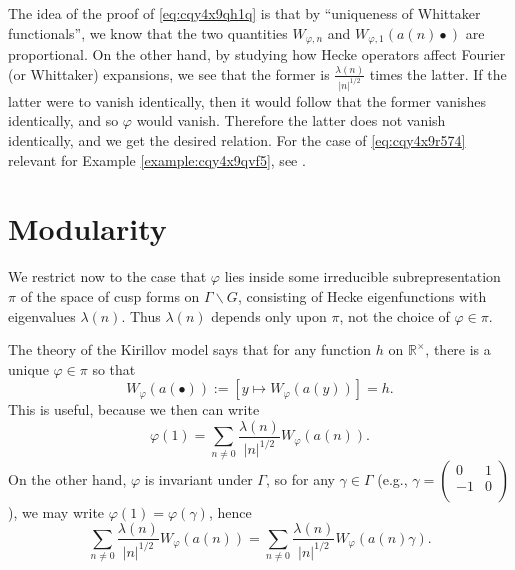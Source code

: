 \documentclass[reqno]{amsart} 
\begin{document}
\begin{remark}\label{remark:cqy4x9qmpf}
  The idea of the proof of \eqref{eq:cqy4x9qh1q} is that by ``uniqueness of Whittaker functionals'', we know that the two quantities $W_{\varphi, n}$ and $W_{\varphi, 1}(a(n) \bullet)$ are proportional.  On the other hand, by studying how Hecke operators affect Fourier (or Whittaker) expansions, we see that the former is $\frac{\lambda(n)}{\lvert n \rvert^{1/2}}$ times the latter.  If the latter were to vanish identically, then it would follow that the former vanishes identically, and so $\varphi$ would vanish.  Therefore the latter does not vanish identically, and we get the desired relation.  For the case of \eqref{eq:cqy4x9r574} relevant for Example \ref{example:cqy4x9qvf5}, see \cite[Chapter VII, \S5.4, Thm 7]{MR0344216}.
\end{remark}

\section{Modularity}


We restrict now to the case that $\varphi$ lies inside some irreducible subrepresentation $\pi$ of the space of cusp forms on $\Gamma \backslash G$, consisting of Hecke eigenfunctions with eigenvalues $\lambda(n)$.  Thus $\lambda(n)$ depends only upon $\pi$, not the choice of $\varphi \in \pi$.

The theory of the Kirillov model says that for any function $h$ on $\mathbb{R}^\times$, there is a unique $\varphi \in \pi$ so that
\begin{equation*}
  W_\varphi(a(\bullet)) := [ y \mapsto W_\varphi(a(y))] = h.
\end{equation*}
This is useful, because we then can write
\begin{equation*}
  \varphi(1) = \sum_{n \neq 0} \frac{\lambda(n)}{\lvert n \rvert^{1/2}} W_\varphi(a(n)).
\end{equation*}
On the other hand, $\varphi$ is invariant under $\Gamma$, so for any $\gamma \in \Gamma$ (e.g., $\gamma = \left(
  \begin{smallmatrix}
    0&1\\
    -1&0 \\
  \end{smallmatrix}
\right)$), we may write $\varphi(1) = \varphi(\gamma)$, hence
\begin{equation*}
  \sum_{n \neq 0} \frac{\lambda(n)}{\lvert n \rvert^{1/2}} W_\varphi(a(n))
  =
  \sum_{n \neq 0} \frac{\lambda(n)}{\lvert n \rvert^{1/2}} W_\varphi(a(n) \gamma).
\end{equation*}
\end{document}
